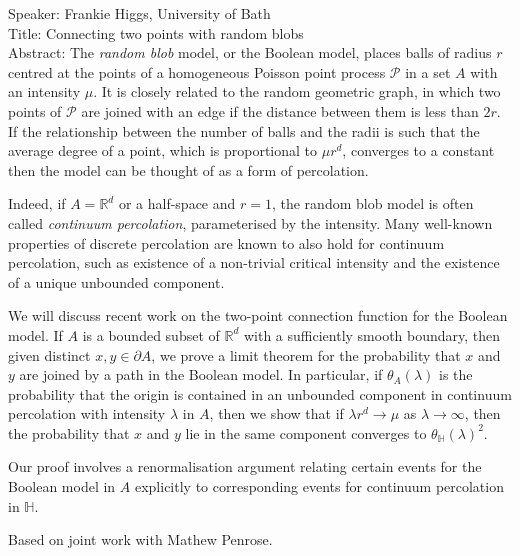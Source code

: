 \documentclass[11pt,a4paper]{article}
\begin{document}
Speaker:
Frankie Higgs, University of Bath\\

Title:
Connecting two points with random blobs\\

Abstract:
The \emph{random blob} model, or the Boolean model, places balls of radius $r$ centred at the points
of a homogeneous Poisson point process $\mathcal{P}$
in a set $A$
with an intensity $\mu$.
It is closely related to the random geometric graph,
in which two points of $\mathcal{P}$
are joined with an edge if the distance between them
is less than $2r$.
If the relationship between the number of balls and the radii
is such that the average degree of a point,
which is proportional to $\mu r^d$,
converges to a constant
then the model can be thought of as a form of percolation.

Indeed, if $A = \mathbb{R}^d$ or a half-space and $r=1$,
the random blob model is often called \emph{continuum percolation},
parameterised by the intensity.
Many well-known properties of discrete percolation are known
to also hold for continuum percolation,
such as existence of a non-trivial critical intensity
and the existence of a unique unbounded component.

We will discuss recent work
on the two-point connection function
for the Boolean model.
%
If $A$ is a bounded subset of $\mathbb{R}^d$
with a sufficiently smooth boundary,
then given distinct $x, y \in \partial A$,
we prove a limit theorem for the probability
that $x$ and $y$ are joined by a path in the Boolean model.
In particular,
if $\theta_A(\lambda)$ is the probability that the
origin is contained in an unbounded component
in continuum percolation with intensity $\lambda$ in $A$,
then we show
that if $\lambda r^d \to \mu$
as $\lambda \to \infty$,
then the probability that $x$ and $y$ lie in the same component
converges to $\theta_{\mathbb{H}}(\lambda)^2$.

Our proof involves a renormalisation argument
relating certain events for the Boolean model in $A$
explicitly to corresponding events for continuum percolation
in $\mathbb{H}$.

Based on joint work with Mathew Penrose.
\end{document}
